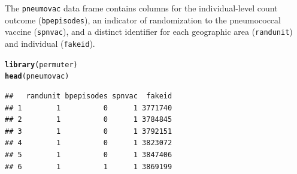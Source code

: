 \documentclass[12pt]{article}\usepackage[]{graphicx}\usepackage[]{color}
\makeatletter
\newcommand{\hlstd}[1]{\textcolor[rgb]{0.345,0.345,0.345}{#1}}%
\newcommand{\hlkwd}[1]{\textcolor[rgb]{0.737,0.353,0.396}{\textbf{#1}}}%
\newenvironment{kframe}{%
 \def\at@end@of@kframe{}%
 \ifinner\ifhmode%
  \def\at@end@of@kframe{\end{minipage}}%
  \begin{minipage}{\columnwidth}%
 \fi\fi%
 \def\FrameCommand##1{\hskip\@totalleftmargin \hskip-\fboxsep
 \colorbox{shadecolor}{##1}\hskip-\fboxsep
     \hskip-\linewidth \hskip-\@totalleftmargin \hskip\columnwidth}%
 \MakeFramed {\advance\hsize-\width
   \@totalleftmargin\z@ \linewidth\hsize
   \@setminipage}}%
 {\par\unskip\endMakeFramed%
 \at@end@of@kframe}
\newenvironment{knitrout}{}{} %
\makeatother
\begin{document}
The \texttt{pneumovac} data frame contains columns for the individual-level count outcome (\texttt{bpepisodes}), an indicator of randomization to the pneumococcal vaccine (\texttt{spnvac}), and a distinct identifier for each geographic area (\texttt{randunit}) and individual (\texttt{fakeid}).
\begin{knitrout}
\color{fgcolor}\begin{kframe}
\begin{alltt}
\hlkwd{library}\hlstd{(permuter)}
\hlkwd{head}\hlstd{(pneumovac)}
\end{alltt}
\begin{verbatim}
##   randunit bpepisodes spnvac  fakeid
## 1        1          0      1 3771740
## 2        1          0      1 3784845
## 3        1          0      1 3792151
## 4        1          0      1 3823072
## 5        1          0      1 3847406
## 6        1          1      1 3869199
\end{verbatim}
\end{kframe}
\end{knitrout}
\end{document}
